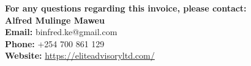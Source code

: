 \documentclass[11pt,a4paper]{article}
\begin{document}
\vspace{0.5cm}

\begin{center}
    \textbf{\color{primaryBlue}For any questions regarding this invoice, please contact:} \\
    \vspace{0.3cm}
    \textbf{Alfred Mulinge Maweu} \\
    \textbf{Email:} binfred.ke@gmail.com \\
    \textbf{Phone:} +254 700 861 129 \\
    \textbf{Website:} \href{https://eliteadvisoryltd.com/}{https://eliteadvisoryltd.com/}
\end{center}
\end{document}
